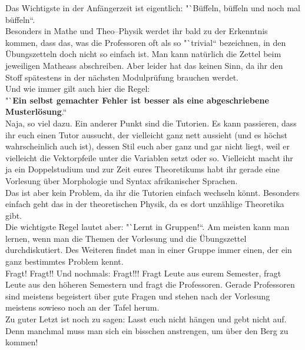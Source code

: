 Das Wichtigste in der Anfängerzeit ist eigentlich: "`Büffeln, büffeln und noch mal büffeln``.\\
Besonders in Mathe und Theo--Physik werdet ihr bald zu der
Erkenntnis kommen, dass das, was die Professoren oft als so
"`trivial`` bezeichnen, in den Übungszetteln doch nicht so einfach ist.
Man kann natürlich die Zettel beim jeweiligen Matheass abschreiben.
Aber leider hat das keinen Sinn, da ihr den Stoff spätestens in der nächsten Modulprüfung brauchen werdet.\\
Und wie immer gilt auch hier die Regel:\\
"`\textbf{Ein selbst gemachter Fehler ist besser als eine abgeschriebene Musterlösung}.``\\
Naja, so viel dazu.
%
Ein anderer Punkt sind die Tutorien.
Es kann passieren, dass ihr euch einen Tutor aussucht, der vielleicht ganz
nett aussieht (und es höchst wahrscheinlich auch ist), dessen Stil
euch aber ganz und gar nicht liegt, weil er vielleicht die
Vektorpfeile unter die Variablen setzt oder so.
Vielleicht macht ihr ja ein Doppelstudium und zur Zeit eures Theoretikums habt ihr gerade
eine Vorlesung über Morphologie und Syntax afrikanischer Sprachen.\\
Das ist aber kein Problem, da ihr die Tutorien einfach wechseln könnt.
Besonders einfach geht das in der theoretischen Physik, da es dort unzählige Theoretika gibt.\\
%
Die wichtigste Regel lautet aber: "`Lernt in Gruppen!{}``.
Am meisten kann man lernen, wenn man die Themen der Vorlesung und die Übungszettel durchdiskutiert.
Des Weiteren findet man in einer Gruppe immer einen, der ein ganz bestimmtes Problem kennt.\\
Fragt! Fragt!! Und nochmals: Fragt!!!
Fragt Leute aus eurem Semester, fragt Leute aus den höheren Semestern und fragt die Professoren.
Gerade Professoren sind meistens begeistert über gute Fragen und stehen nach der Vorlesung
meistens sowieso noch an der Tafel herum.\\
%
Zu guter Letzt ist noch zu sagen: Lasst euch nicht hängen und gebt nicht auf.
Denn manchmal muss man sich ein bisschen anstrengen, um über den Berg zu kommen!

